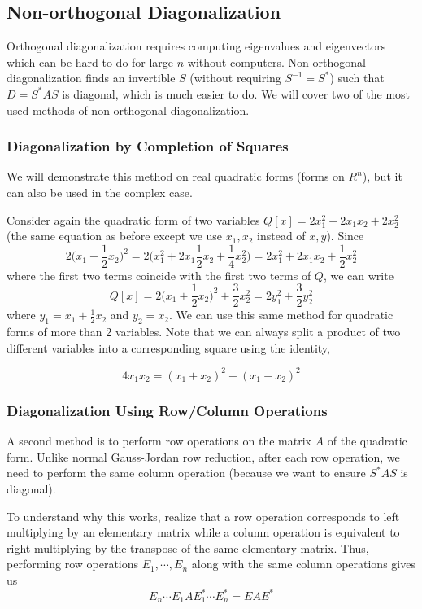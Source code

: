 \subsection{Non-orthogonal Diagonalization} 

Orthogonal diagonalization requires computing eigenvalues and eigenvectors which can be hard to do for large $n$ without computers. Non-orthogonal diagonalization finds an invertible $S$ (without requiring $S^{-1} = S^{*}$) such that $D = S^{*}AS$ is diagonal, which is much easier to do. We will cover two of the most used methods of non-orthogonal diagonalization. 

\subsubsection{Diagonalization by Completion of Squares} 

We will demonstrate this method on real quadratic forms (forms on $
R^{n}$), but it can also be used in the complex case. 

Consider again the quadratic form of two variables $Q[x] = 2x_{1}^{2} + 2x_{1} x_{2} + 2x_{2}^{2}$ (the same equation as before except we use $x_{1}, x_{2}$ instead of $x, y$). Since 
$$2 \Big( x_{1} + \frac{1}{2} x_{2} \Big)^{2} = 2 \Big( x_{1}^{2} + 2 x_{1} \frac{1}{2} x_{2} + \frac{1}{4} x_{2}^{2} \Big) = 2x_{1}^{2} + 2x_{1}x_{2} + \frac{1}{2} x_{2}^{2}$$
where the first two terms coincide with the first two terms of $Q$, we can write 
$$Q[x] = 2 \Big( x_{1} + \frac{1}{2} x_{2} \Big)^{2} + \frac{3}{2} x_{2}^{2} = 2y_{1}^{2} + \frac{3}{2} y_{2}^{2}$$
where $y_{1} = x_{1} + \frac{1}{2} x_{2}$ and $y_{2} = x_{2}$. We can use this same method for quadratic forms of more than 2 variables. Note that we can always split a product of two different variables into a corresponding square using the identity, 

$$4 x_{1} x_{2} = (x_{1} + x_{2})^{2} - (x_{1} - x_{2})^{2}$$

\subsubsection{Diagonalization Using Row/Column Operations}

A second method is to perform row operations on the matrix $A$ of the quadratic form. Unlike normal Gauss-Jordan row reduction, after each row operation, we need to perform the same column operation (because we want to ensure $S^{*} AS$ is diagonal). 

To understand why this works, realize that a row operation corresponds to left multiplying by an elementary matrix while a column operation is equivalent to right multiplying by the transpose of the same elementary matrix. Thus, performing row operations $E_{1}, \cdots, E_{n}$ along with the same column operations gives us 
$$E_{n} \cdots E_{1} A E_{1}^{*} \cdots E_{n}^{*} = EAE^{*}$$

